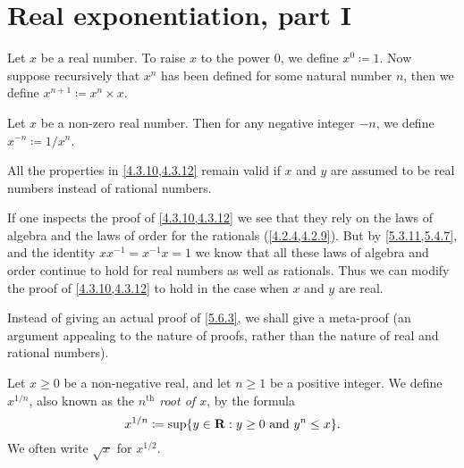 \section{Real exponentiation, part I}\label{sec 5.6}

\begin{definition}\label{5.6.1}
  Let \(x\) be a real number.
  To raise \(x\) to the power \(0\), we define \(x^0 \coloneqq 1\).
  Now suppose recursively that \(x^n\) has been defined for some natural number \(n\), then we define \(x^{n + 1} \coloneqq x^n \times x\).
\end{definition}

\begin{definition}\label{5.6.2}
  Let \(x\) be a non-zero real number.
  Then for any negative integer \(-n\), we define \(x^{-n} \coloneqq 1 / x^n\).
\end{definition}

\begin{proposition}\label{5.6.3}
  All the properties in \cref{4.3.10,4.3.12} remain valid if \(x\) and \(y\) are assumed to be real numbers instead of rational numbers.
\end{proposition}

\begin{meta-proof}
If one inspects the proof of \cref{4.3.10,4.3.12} we see that they rely on the laws of algebra and the laws of order for the rationals (\cref{4.2.4,4.2.9}).
But by \cref{5.3.11,5.4.7}, and the identity \(xx^{-1} = x^{-1} x = 1\) we know that all these laws of algebra and order continue to hold for real numbers as well as rationals.
Thus we can modify the proof of \cref{4.3.10,4.3.12} to hold in the case when \(x\) and \(y\) are real.
\end{meta-proof}

\begin{note}
  Instead of giving an actual proof of \cref{5.6.3}, we shall give a meta-proof
  (an argument appealing to the nature of proofs, rather than the nature of real and rational numbers).
\end{note}

\begin{definition}\label{5.6.4}
  Let \(x \geq 0\) be a non-negative real, and let \(n \geq 1\) be a positive integer.
  We define \(x^{1 / n}\), also known as the \emph{\(n^{\text{th}}\) root of \(x\)}, by the formula
  \[
    x^{1 / n} \coloneqq \sup\{y \in \mathbf{R} : y \geq 0 \text{ and } y^n \leq x\}.
  \]
  We often write \(\sqrt{x}\) for \(x^{1 / 2}\).
\end{definition}

